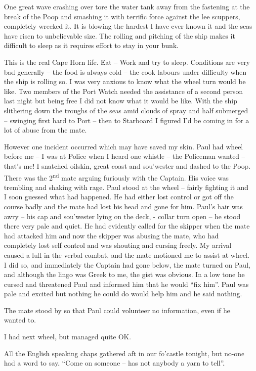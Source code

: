 \documentclass[
  11pt,
  msmallroyalvopaper
]{memoir}
\begin{document}
One great wave crashing over tore the water tank away from the fastening
at the break of the Poop and smashing it with terrific force against the
lee scuppers, completely wrecked it. It is blowing the hardest I have
ever known it and the seas have risen to unbelievable size. The rolling
and pitching of the ship makes it difficult to sleep as it requires
effort to stay in your bunk.

This is the real Cape Horn life. Eat -- Work and try to sleep.
Conditions are very bad generally -- the food is always cold -- the cook
labours under difficulty when the ship is rolling so. I was very anxious
to know what the wheel turn would be like. Two members of the Port Watch
needed the assistance of a second person last night but being free I did
not know what it would be like. With the ship slithering down the
troughs of the seas amid clouds of spray and half submerged -- swinging
first hard to Port -- then to Starboard I figured I'd be coming in for a
lot of abuse from the mate.

However one incident occurred which may have saved my skin. Paul had
wheel before me -- I was at Police when I heard one whistle -- the
Policeman wanted -- that's me! I snatched oilskin, great coast and
sou'wester and dashed to the Poop. There was the 2\textsuperscript{nd}
mate arguing furiously with the Captain. His voice was trembling and
shaking with rage. Paul stood at the wheel -- fairly fighting it and I
soon guessed what had happened. He had either lost control or got off
the course badly and the mate had lost his head and gone for him. Paul's
hair was awry -- his cap and sou'wester lying on the deck, - collar turn
open -- he stood there very pale and quiet. He had evidently called for
the skipper when the mate had attacked him and now the skipper was
abusing the mate, who had completely lost self control and was shouting
and cursing freely. My arrival caused a lull in the verbal combat, and
the mate motioned me to assist at wheel. I did so, and immediately the
Captain had gone below, the mate turned on Paul, and although the lingo
was Greek to me, the gist was obvious. In a low tone he cursed and
threatened Paul and informed him that he would ``fix him''. Paul was
pale and excited but nothing he could do would help him and he said
nothing.

The mate stood by so that Paul could volunteer no information, even if
he wanted to.

I had next wheel, but managed quite OK.

All the English speaking chaps gathered aft in our fo'castle tonight,
but no-one had a word to say. ``Come on someone -- has not anybody a
yarn to tell''.
\end{document}
